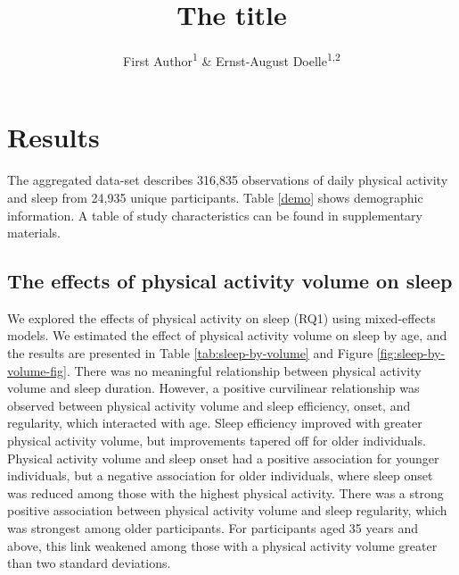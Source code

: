 \documentclass[
  man]{apa6}
\title{The title}
\author{First Author\textsuperscript{1} \& Ernst-August Doelle\textsuperscript{1,2}}
\date{}
\affiliation{\vspace{0.5cm}\textsuperscript{1} Wilhelm-Wundt-University\\\textsuperscript{2} Konstanz Business School}
\begin{document}
\maketitle

\hypertarget{results}{%
\section{Results}\label{results}}

The aggregated data-set describes 316,835 observations of daily physical activity and sleep from 24,935 unique participants. Table \ref{demo} shows demographic information. A table of study characteristics can be found in supplementary materials.

\hypertarget{the-effects-of-physical-activity-volume-on-sleep}{%
\subsection{The effects of physical activity volume on sleep}\label{the-effects-of-physical-activity-volume-on-sleep}}

We explored the effects of physical activity on sleep (RQ1) using mixed-effects models. We estimated the effect of physical activity volume on sleep by age, and the results are presented in Table \ref{tab:sleep-by-volume} and Figure \ref{fig:sleep-by-volume-fig}. There was no meaningful relationship between physical activity volume and sleep duration. However, a positive curvilinear relationship was observed between physical activity volume and sleep efficiency, onset, and regularity, which interacted with age. Sleep efficiency improved with greater physical activity volume, but improvements tapered off for older individuals. Physical activity volume and sleep onset had a positive association for younger individuals, but a negative association for older individuals, where sleep onset was reduced among those with the highest physical activity. There was a strong positive association between physical activity volume and sleep regularity, which was strongest among older participants. For participants aged 35 years and above, this link weakened among those with a physical activity volume greater than two standard deviations.

\renewcommand{\arraystretch}{0.8}
\end{document}
